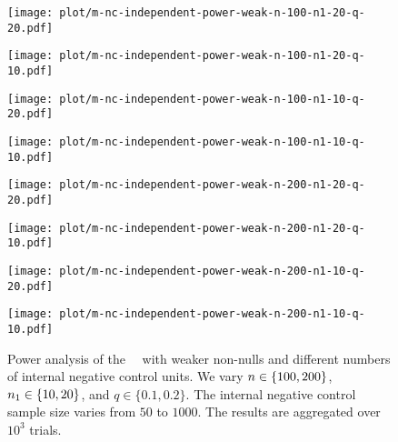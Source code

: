 \begin{figure}[tbp]
    \centering
    \begin{minipage}{6.7cm}
    \centering
\texttt{[image: plot/m-nc-independent-power-weak-n-100-n1-20-q-20.pdf]}
    \end{minipage}
    \begin{minipage}{6.7cm}
    \centering
\texttt{[image: plot/m-nc-independent-power-weak-n-100-n1-20-q-10.pdf]}
    \end{minipage}
    \begin{minipage}{6.7cm}
    \centering
\texttt{[image: plot/m-nc-independent-power-weak-n-100-n1-10-q-20.pdf]}
    \end{minipage}
    \begin{minipage}{6.7cm}
    \centering
\texttt{[image: plot/m-nc-independent-power-weak-n-100-n1-10-q-10.pdf]}
    \end{minipage}
    \begin{minipage}{6.7cm}
    \centering
\texttt{[image: plot/m-nc-independent-power-weak-n-200-n1-20-q-20.pdf]}
    \end{minipage}
            \begin{minipage}{6.7cm}
    \centering
\texttt{[image: plot/m-nc-independent-power-weak-n-200-n1-20-q-10.pdf]}
    \end{minipage}
    \begin{minipage}{6.7cm}
    \centering
\texttt{[image: plot/m-nc-independent-power-weak-n-200-n1-10-q-20.pdf]}
\end{minipage}
\begin{minipage}{6.7cm}
    \centering
\texttt{[image: plot/m-nc-independent-power-weak-n-200-n1-10-q-10.pdf]}
\end{minipage}
    \caption{{Power analysis of the \BH~\nickname~with weaker non-nulls and different numbers of internal negative control units. We vary ${n} \in \{100, 200\}$, ${n_1} \in \{10, 20\}$, and $q \in \{0.1, 0.2\}$. The internal negative control sample size varies from $50$ to $1000$. The results are aggregated over $10^3$ trials.}}
    \label{fig:nc.sample.size.threshold.weak}
\end{figure}

